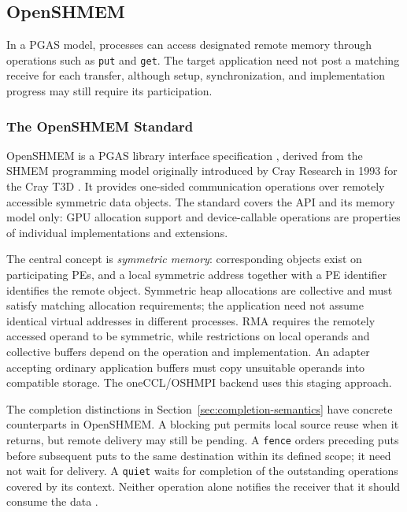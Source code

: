 \subsection{OpenSHMEM}\label{sec:pgas}

In a PGAS model, processes can access designated remote memory through operations such as \texttt{put} and \texttt{get}. The target application need not post a matching receive for each transfer, although setup, synchronization, and implementation progress may still require its participation.

\subsubsection{The OpenSHMEM Standard}

OpenSHMEM is a PGAS library interface specification \cite{openshmem_spec}, derived from the SHMEM programming model originally introduced by Cray Research in 1993 for the Cray T3D \cite{cray_t3d_history}. It provides one-sided communication operations over remotely accessible symmetric data objects. The standard covers the API and its memory model only: GPU allocation support and device-callable operations are properties of individual implementations and extensions.

The central concept is \emph{symmetric memory}: corresponding objects exist on participating \acp{PE}, and a local symmetric address together with a PE identifier identifies the remote object. Symmetric heap allocations are collective and must satisfy matching allocation requirements; the application need not assume identical virtual addresses in different processes. RMA requires the remotely accessed operand to be symmetric, while restrictions on local operands and collective buffers depend on the operation and implementation. An adapter accepting ordinary application buffers must copy unsuitable operands into compatible storage. The oneCCL/OSHMPI backend uses this staging approach.

The completion distinctions in Section~\ref{sec:completion-semantics} have concrete counterparts in OpenSHMEM. A blocking put permits local source reuse when it returns, but remote delivery may still be pending. A \texttt{fence} orders preceding puts before subsequent puts to the same destination within its defined scope; it need not wait for delivery. A \texttt{quiet} waits for completion of the outstanding operations covered by its context. Neither operation alone notifies the receiver that it should consume the data \cite{openmpi_shmem_fence_2026,openmpi_shmem_quiet_2026}.


